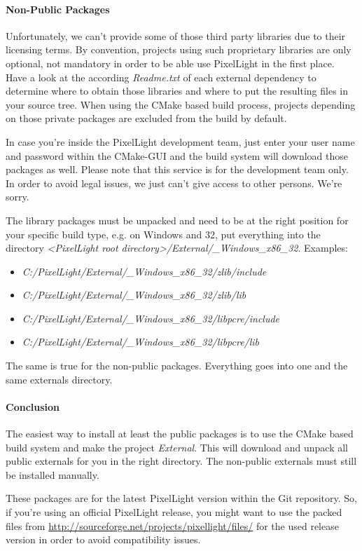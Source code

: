 \paragraph{Non-Public Packages}
Unfortunately, we can't provide some of those third party libraries due to their licensing terms. By convention, projects using such proprietary libraries are only optional, not mandatory in order to be able use PixelLight in the first place. Have a look at the according \emph{Readme.txt} of each external dependency to determine where to obtain those libraries and where to put the resulting files in your source tree. When using the CMake based build process, projects depending on those private packages are excluded from the build by default.

In case you're inside the PixelLight development team, just enter your user name and password within the CMake-GUI and the build system will download those packages as well. Please note that this service is for the development team only. In order to avoid legal issues, we just can't give access to other persons. We're sorry.

The library packages must be unpacked and need to be at the right position for your specific build type, e.g. on Windows and \SI{32}{\bit}, put everything into the directory \emph{\textless PixelLight root directory\textgreater /External/\_Windows\_x86\_32}. Examples:
\begin{itemize}
\item{\emph{C:/PixelLight/External/\_Windows\_x86\_32/zlib/include}}
\item{\emph{C:/PixelLight/External/\_Windows\_x86\_32/zlib/lib}}
\item{\emph{C:/PixelLight/External/\_Windows\_x86\_32/libpcre/include}}
\item{\emph{C:/PixelLight/External/\_Windows\_x86\_32/libpcre/lib}}
\end{itemize}
The same is true for the non-public packages. Everything goes into one and the same externals directory.


\paragraph{Conclusion}
The easiest way to install at least the public packages is to use the CMake based build system and make the project \emph{External}. This will download and unpack all public externals for you in the right directory. The non-public externals must still be installed manually.

These packages are for the latest PixelLight version within the Git repository. So, if you're using an official PixelLight release, you might want to use the packed files from \url{http://sourceforge.net/projects/pixellight/files/} for the used release version in order to avoid compatibility issues.